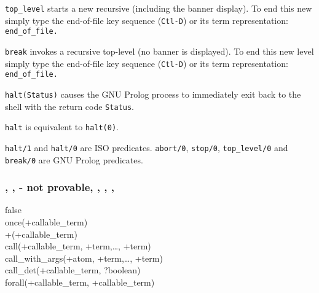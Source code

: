 \texttt{top\_level} starts a new recursive  (including the
banner display). To end this new  simply type the end-of-file
key sequence (\texttt{Ctl-D}) or its term representation:
\texttt{end\_of\_file.}

\texttt{break} invokes a recursive top-level (no banner is displayed). To
end this new level simply type the end-of-file key sequence (\texttt{Ctl-D})
or its term representation: \texttt{end\_of\_file.}

\texttt{halt(Status)} causes the GNU Prolog process to immediately exit back to
the shell with the return code \texttt{Status}.

\texttt{halt} is equivalent to \texttt{halt(0)}.

\begin{PlErrors}



\end{PlErrors}

\Portability

\texttt{halt/1} and \texttt{halt/0} are ISO predicates. \texttt{abort/0},
\texttt{stop/0}, \texttt{top\_level/0} and \texttt{break/0} are GNU Prolog
predicates.

\subsubsection{, ,  - not provable,
               ,
	       , , }

\begin{TemplatesOneCol}
false\\
once(+callable\_term)\\
{\bs}+(+callable\_term) \\
call(+callable\_term, +term,\ldots, +term)\\
call\_with\_args(+atom, +term,\ldots, +term)\\
call\_det(+callable\_term, ?boolean) \\
forall(+callable\_term, +callable\_term)

\end{TemplatesOneCol}

\Description

